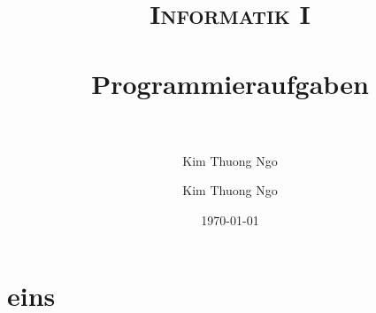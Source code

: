 \documentclass[paper=a4, fontsize=11pt]{scrartcl}
\author{Kim Thuong Ngo}
\title{	
\normalfont \normalsize 
\textsc{Informatik I} \\ [25pt] 
\horrule{0.5pt} \\[0.4cm] 
\huge Programmieraufgaben \\ 
\horrule{2pt} \\[0.5cm] 
}
\author{Kim Thuong Ngo}
\date{\normalsize\today}
\numberwithin{equation}{section}
\numberwithin{figure}{section}
\numberwithin{table}{section}
\begin{document}
\maketitle 

\newpage

\tableofcontents

\newpage


\section{eins}
\end{document}
